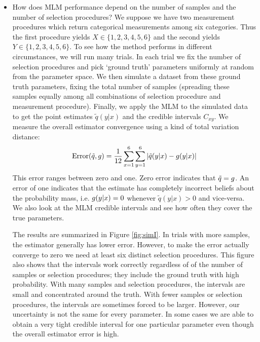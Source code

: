\begin{itemize}
    \item How does MLM performance depend on the number of samples and the number of selection procedures?  We suppose we have two measurement procedures which return categorical measurements among six categories.  Thus the first procedure yields $X\in \{1,2,3,4,5,6\}$ and the second yields $Y\in \{1,2,3,4,5,6\}$.  To see how the method performs in different circumstances, we will run many trials.  In each trial we fix the number of selection procedures and pick `ground truth' parameters uniformly at random from the parameter space.  We then simulate a dataset from these ground truth parameters, fixing the total number of samples (spreading these samples equally among all combinations of selection procedure and measurement procedure).  Finally, we apply the MLM to the simulated data to get the point estimates $\tilde q(y|x)$ and the credible intervals $C_{x y}$.  We measure the overall estimator convergence using a kind of total variation distance:
    \[
    \mathrm{Error}(\tilde q,g)=\frac{1}{12}\sum_{x=1}^{6}\sum_{y=1}^{6} |\tilde q(y|x) - g(y|x)|
    \]
    This error ranges between zero and one.  Zero error indicates that $\tilde q=g$. An error of one indicates that the estimate has completely incorrect beliefs about the probability mass, i.e. $g(y|x)=0$ whenever $\tilde q(y|x)>0$ and vice-versa.  We also look at the MLM credible intervals and see how often they cover the true parameters.  

    The results are summarized in Figure \ref{fig:simI}.  In trials with more samples, the estimator generally has lower error.  However, to make the error actually converge to zero we need at least six distinct selection procedures.  This figure also shows that the intervals work correctly regardless of of the number of samples or selection procedures; they include the ground truth with high probability.   With many samples and selection procedures, the intervals are small and concentrated around the truth.  With fewer samples or selection procedures, the intervals are sometimes forced to be larger.  However, our uncertainty is not the same for every parameter.  In some cases we are able to obtain a very tight credible interval for one particular parameter even though the overall estimator error is high.  


\end{itemize}
